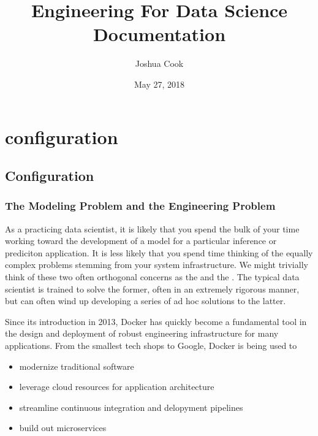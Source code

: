 \documentclass[letterpaper,10pt,english]{sphinxmanual}
\title{Engineering For Data Science Documentation}
\date{May 27, 2018}
\author{Joshua Cook}
\begin{document}
\maketitle
\sphinxtableofcontents
{}\label{\detokenize{index::doc}}



\chapter{configuration}
\label{\detokenize{index:configuration}}\label{\detokenize{index:welcome-to-engineering-for-data-science-s-documentation}}

\section{Configuration}
\label{\detokenize{01-amazon-web-services:Configuration}}\label{\detokenize{01-amazon-web-services::doc}}

\subsection{The Modeling Problem and the Engineering Problem}
\label{\detokenize{01-amazon-web-services:The-Modeling-Problem-and-the-Engineering-Problem}}
As a practicing data scientist, it is likely that you spend the bulk of
your time working toward the development of a model for a particular
inference or prediciton application. It is less likely that you spend
time thinking of the equally complex problems stemming from your system
infrastructure. We might trivially think of these two often orthogonal
concerns as the  and the .
The typical data scientist is trained to solve the former, often in an
extremely rigorous manner, but can often wind up developing a series of
ad hoc solutions to the latter.

Since its introduction in 2013, Docker has quickly become a fundamental
tool in the design and deployment of robust engineering infrastructure
for many applications. From the smallest tech shops to Google, Docker is
being used to
\begin{itemize}
\item {} 
modernize traditional software

\item {} 
leverage cloud resources for application architecture

\item {} 
streamline continuous integration and delopyment pipelines

\item {} 
build out microservices

\end{itemize}
\end{document}
